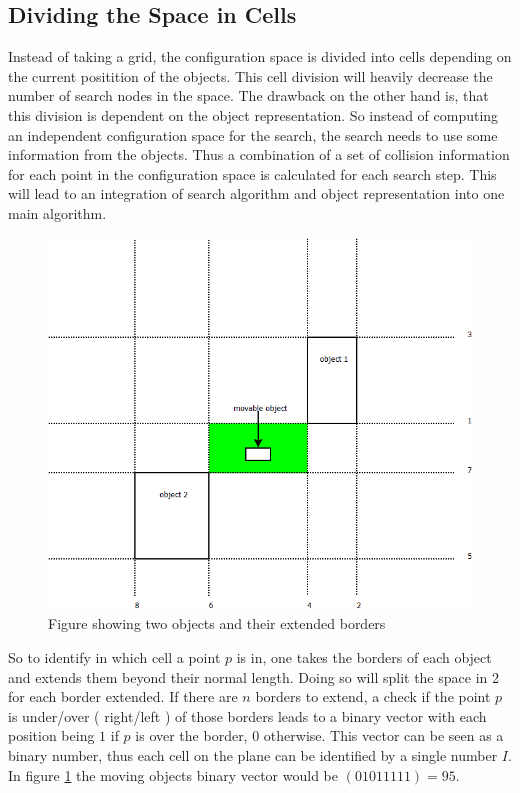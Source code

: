 \subsection{Dividing the Space in Cells}
\label{subsec::cells}
Instead of taking a grid, the configuration space is divided into cells depending on the current positition of the objects. This cell division will heavily decrease the number of search nodes in the space. The drawback on the other hand is, that this division is dependent on the object representation. So instead of computing an independent configuration space for the search, the search needs to use some information from the objects. Thus a combination of a set of collision information for each point in the configuration space is calculated for each search step. This will lead to an integration of search algorithm and object representation into one main algorithm.\\
\begin{figure}[H]
\centering
\includegraphics[scale=0.5]{cellDivision}
\caption{Figure showing two objects and their extended borders}
\label{cellDivision}
\end{figure}
So to identify in which cell a point $p$ is in, one takes the borders of each object and extends them beyond their normal length. Doing so will split the space in 2 for each border extended. If there are $n$ borders to extend, a check if the point $p$ is under/over ( right/left ) of those borders leads to a binary vector with each position being $1$ if $p$ is over the border, $0$ otherwise. This vector can be seen as a binary number, thus each cell on the plane can be identified by a single number $I$. In figure \ref{cellDivision} the moving objects binary vector would be $(0 1 0 1 1 1 1 1) =  95$.\\
